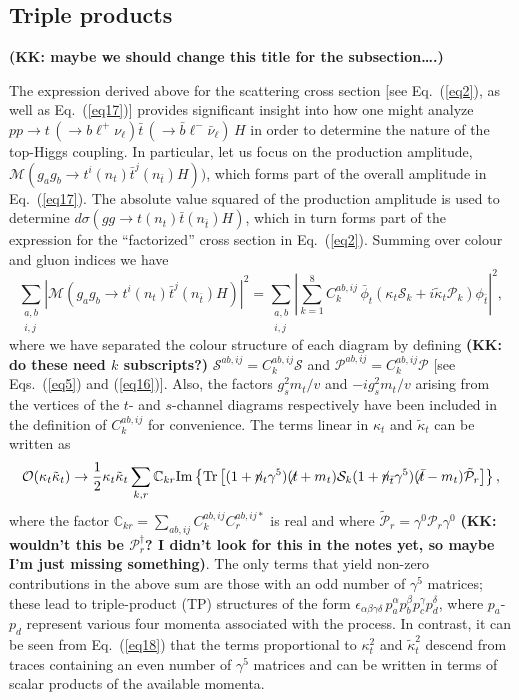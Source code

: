\documentclass[aps,preprint,tightenlines,floatfix,superscriptaddress,nofootinbib,showpacs]{revtex4-1}
\def\beq{\begin{equation}}
\def\eeq{\end{equation}}
\def\tbslash{\tbar\hspace{-10pt}\not{}\hspace{4pt}}
\def\tslash{t\hspace{-10pt}\not{}\hspace{4pt}}
\def\nslash{n\hspace{-10pt}\not{}\hspace{4pt}}
\def\tbar{\bar{t}}
\def\bbar{\bar{b}}
\def\nubar{{\bar{\nu}}_{\ell}}
\def\ppprocess{pp\to t\,\left(\rightarrow b {\ell}^+ \nu_{\ell}\right) \tbar\,\left(\rightarrow\bbar {\ell}^-\nubar\right)\,H}
\def\kp{\kappa_t}
\def\kpt{\tilde{\kappa}_t}
\begin{document}
\subsection{Triple products}
{\bf (KK: maybe we should change this title for the subsection\ldots.)}

The expression derived above for the scattering cross
section [see Eq.~(\ref{eq2}), as well as Eq.~(\ref{eq17})]
provides significant insight into
how one might analyze $\ppprocess$ in order to determine
the nature of the top-Higgs coupling.  In particular,
let us focus on the production amplitude,
$\mathcal{M}(g_ag_b \to t^i(n_t)\tbar^j(n_{\tbar})H))$, which forms
part of the overall amplitude in Eq.~(\ref{eq17}).
The absolute value squared of the production amplitude
is used to determine $d\sigma(gg\to t(n_t)\tbar (n_{\tbar})H)$,
which in turn forms part of the expression for the ``factorized'' cross section
in Eq.~(\ref{eq2}).  Summing over colour and gluon indices
we have
%
\beq
\label{eq18}
\sum_{\substack{a,b \\ i,j}}|\mathcal{M}(g_ag_b \to t^i(n_t)\tbar^j(n_{\tbar})H)|^2=\sum_{\substack{a,b \\ i,j}}\left|\sum^{8}_{k=1}C^{ab,ij}_k\,\bar{\phi}_t (\kp\mathcal{S}_k+i\kpt\mathcal{P}_k)\phi_{\tbar}\right|^2,
\eeq
%
where we have separated the colour structure of each diagram by defining
{\bf (KK: do these need $k$ subscripts?)}
$\mathcal{S}^{ab,ij}= C^{ab,ij}_k \mathcal{S}$ and
$\mathcal{P}^{ab,ij}= C^{ab,ij}_k \mathcal{P}$
[see Eqs.~(\ref{eq5}) and (\ref{eq16})]. Also, the factors
$g^2_s m_t/v$ and $-ig^2_s m_t/v$ arising from the vertices of the $t$-
and $s$-channel diagrams respectively have been included in the
definition of $C^{ab,ij}_k$ for convenience. The terms linear in $\kp$
and $\kpt$ can be written as
%
\beq
\label{eq19}
\mathcal{O}(\kp\kpt)\to \frac{1}{2}\kp\kpt \sum_{k,r}\mathbb{C}_{kr}\mathrm{Im}
\left\lbrace \mathrm{Tr}\left[ (1+\nslash_t \gamma^5)(\tslash+m_t)\mathcal{S}_k(1+\nslash_{\tbar}\gamma^5
 )(\tbslash -m_t)\tilde{\mathcal{P}}_r \right] \right\rbrace ,
\eeq
%
where the factor $\mathbb{C}_{kr}=\sum_{ab,ij}C^{ab,ij}_k
C^{ab,ij*}_r$ is real and where $\tilde{\mathcal{P}}_r = \gamma^0
\mathcal{P}_r \gamma^0$ {\bf (KK: wouldn't this be
  $\mathcal{P}_r^\dagger$? I didn't look for this in the notes
  yet, so maybe I'm just missing something)}.
The only terms that yield non-zero contributions
in the above sum are those with an
odd number of $\gamma^5$ matrices; these lead to triple-product
(TP) structures
of the form $\epsilon_{\alpha\beta\gamma\delta}\,p^{\alpha}_ap^{\beta}_bp^{\gamma}_cp^{\delta}_d$,
where $p_a$-$p_d$ represent various four momenta associated with the process.
In contrast,
it can be seen from Eq.~(\ref{eq18}) that the terms proportional to
$\kp^2$ and $\tilde{\kappa}^2_t$ descend from traces containing
an even number of $\gamma^5$
matrices and can be written in terms of scalar products of the
available momenta.\par
\end{document}
